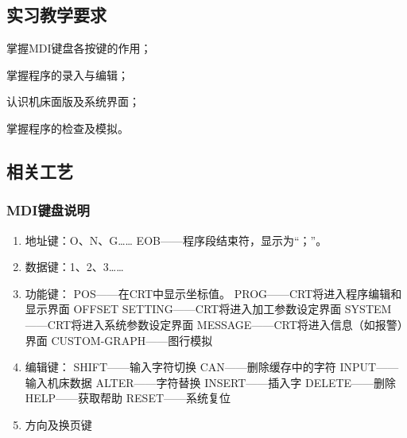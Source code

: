 \jxhj{%
}

\makeshouye%

\subsection{实习教学要求}
\begin{compactenum}[1、]
\item 掌握MDI键盘各按键的作用；
\item 掌握程序的录入与编辑；
\item 认识机床面版及系统界面；
\item 掌握程序的检查及模拟。
\end{compactenum}


\subsection{相关工艺}
\subsubsection{MDI键盘说明}
\begin{enumerate}[1、]
\item 地址键：O、N、G……
      \subitem  EOB——程序段结束符，显示为“；”。
\item 数据键：1、2、3……
\item 功能键：
\subitem POS——在CRT中显示坐标值。
\subitem PROG——CRT将进入程序编辑和显示界面
\subitem OFFSET SETTING——CRT将进入加工参数设定界面
\subitem SYSTEM——CRT将进入系统参数设定界面
\subitem MESSAGE——CRT将进入信息（如报警）界面
\subitem CUSTOM-GRAPH——图行模拟
\item 	编辑键：
\subitem SHIFT——输入字符切换
\subitem CAN——删除缓存中的字符
\subitem INPUT——输入机床数据
\subitem ALTER——字符替换
\subitem INSERT——插入字
\subitem DELETE——删除
\subitem HELP——获取帮助
\subitem RESET——系统复位
	\item 方向及换页键

\end{enumerate}


